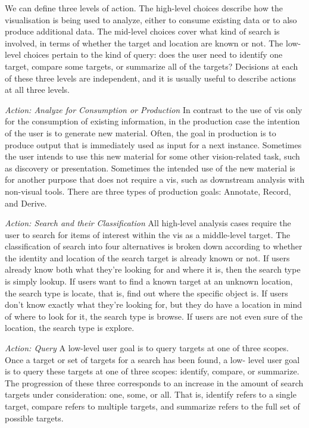 \documentclass[
]{book}
\begin{document}
We can define three levels of action. The high-level choices describe how the visualisation is being used to analyze, either to consume existing data or to also produce additional data. The mid-level choices cover what kind of search is involved, in terms of whether the target and location are known or not. The low-level choices pertain to the kind of query: does the user need to identify one target, compare some targets, or summarize all of the targets? Decisions at each of these three levels are independent, and it is usually useful to describe actions at all three levels.

\emph{Action: Analyze for Consumption or Production} In contrast to the use of vis only for the consumption of existing information, in the production case the intention of the user is to generate new material. Often, the goal in production is to produce output that is immediately used as input for a next instance. Sometimes the user intends to use this new material for some other vision-related task, such as discovery or presentation. Sometimes the intended use of the new material is for another purpose that does not require a vis, such as downstream analysis with non-visual tools. There are three types of production goals: Annotate, Record, and Derive.

\emph{Action: Search and their Classification} All high-level analysis cases require the user to search for items of interest within the vis as a middle-level target. The classification of search into four alternatives is broken down according to whether the identity and location of the search target is already known or not. If users already know both what they're looking for and where it is, then the search type is simply lookup. If users want to find a known target at an unknown location, the search type is locate, that is, find out where the specific object is. If users don't know exactly what they're looking for, but they do have a location in mind of where to look for it, the search type is browse. If users are not even sure of the location, the search type is explore.

\emph{Action: Query}
A low-level user goal is to query targets at one of three scopes. Once a target or set of targets for a search has been found, a low- level user goal is to query these targets at one of three scopes: identify, compare, or summarize. The progression of these three corresponds to an increase in the amount of search targets under consideration: one, some, or all. That is, identify refers to a single target, compare refers to multiple targets, and summarize refers to the full set of possible targets.
\end{document}
